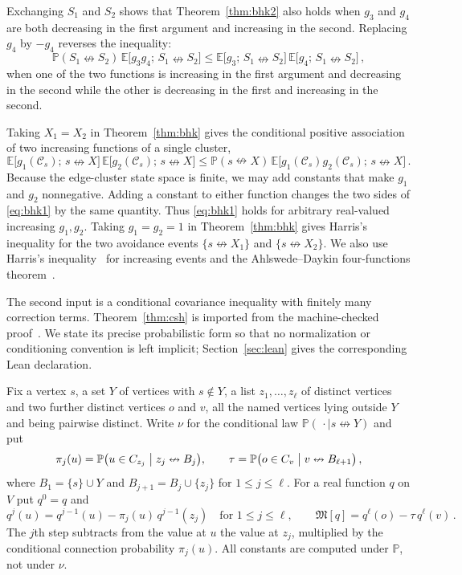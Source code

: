 \documentclass[11pt]{article}
\theoremstyle{definition}
\theoremstyle{remark}
\newcommand{\PP}{\mathbb P}
\newcommand{\EE}{\mathbb E}
\newcommand{\ncon}{\nleftrightarrow}
\newcommand{\eC}{\mathcal C}
\newcommand{\Marg}{\mathfrak M}
\begin{document}
Exchanging $S_1$ and $S_2$ shows that Theorem~\ref{thm:bhk2} also holds when $g_3$ and
$g_4$ are both decreasing in the first argument and increasing in the second. Replacing
$g_4$ by $-g_4$ reverses the inequality:
\begin{equation}\label{eq:bhkneg}
 \PP(S_1\ncon S_2)\,\EE\bigl[g_3g_4;\,S_1\ncon S_2\bigr]\leq
 \EE\bigl[g_3;\,S_1\ncon S_2\bigr]\,\EE\bigl[g_4;\,S_1\ncon S_2\bigr]\,,
\end{equation}
when one of the two functions is increasing in the first argument and decreasing in the
second while the other is decreasing in the first and increasing in the second.

Taking $X_1=X_2$ in Theorem~\ref{thm:bhk} gives the conditional positive association of two
increasing functions of a single cluster,
\begin{equation}\label{eq:bhk1}
 \EE\bigl[g_1(\eC_s);\,s\ncon X\bigr]\,\EE\bigl[g_2(\eC_s);\,s\ncon X\bigr]
\leq \PP(s\ncon X)\,\EE\bigl[g_1(\eC_s)g_2(\eC_s);\,s\ncon X\bigr]\,.
\end{equation}
Because the edge-cluster state space is finite, we may add constants that make $g_1$ and
$g_2$ nonnegative. Adding a constant to either function changes the two sides of
\eqref{eq:bhk1} by the same quantity. Thus \eqref{eq:bhk1} holds for arbitrary real-valued
increasing $g_1,g_2$. Taking $g_1=g_2=1$ in Theorem~\ref{thm:bhk} gives Harris's inequality
for the two avoidance events $\{s\ncon X_1\}$ and $\{s\ncon X_2\}$. We also use Harris's
inequality~\cite{H} for increasing events and the Ahlswede--Daykin four-functions
theorem~\cite{AD}.

The second input is a conditional covariance inequality with finitely many correction
terms. Theorem~\ref{thm:csh} is imported from the machine-checked proof~\cite{Dev}. We
state its precise probabilistic form so that no normalization or conditioning convention
is left implicit; Section~\ref{sec:lean} gives the corresponding Lean declaration.

Fix a vertex $s$, a set $Y$ of vertices with $s\notin Y$, a list $z_1,\dots,z_\ell$ of
distinct vertices and two further distinct vertices $o$ and $v$, all the named vertices
lying outside $Y$ and being pairwise distinct. Write $\nu$ for the conditional law
$\PP(\,\cdot\mid s\ncon Y)$ and put
\begin{equation}\label{eq:constants}
 \pi_j(u)=\PP\bigl(u\in C_{z_j}\bigm|z_j\ncon B_j\bigr),\qquad
 \tau=\PP\bigl(o\in C_v\bigm|v\ncon B_{\ell+1}\bigr)\,,
\end{equation}
where $B_1=\{s\}\cup Y$ and $B_{j+1}=B_j\cup\{z_j\}$ for $1\le j\le\ell$. For a real
function $q$ on $V$ put $q^0=q$ and
\begin{equation}\label{eq:levels}
 q^j(u)=q^{j-1}(u)-\pi_j(u)\,q^{j-1}(z_j)\quad\text{for } 1\le j\le\ell,\qquad
 \Marg[q]=q^\ell(o)-\tau\,q^\ell(v)\,.
\end{equation}
The $j$th step subtracts from the value at $u$ the value at $z_j$, multiplied by the
conditional connection probability $\pi_j(u)$. All constants are computed under $\PP$,
not under $\nu$.
\end{document}
